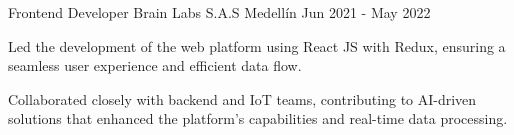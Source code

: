 \begin{cventries}
{}
\cventry
{Frontend Developer} %
{Brain Labs S.A.S} %
{Medellín} %
{Jun 2021 - May 2022} %
{
  \begin{cvitems} %
    \item {Led the development of the web platform using React JS with Redux, ensuring a seamless user experience and efficient data flow.}
    \item {Collaborated closely with backend and IoT teams, contributing to AI-driven solutions that enhanced the platform's capabilities and real-time data processing.}
  \end{cvitems}
}
\end{cventries}
